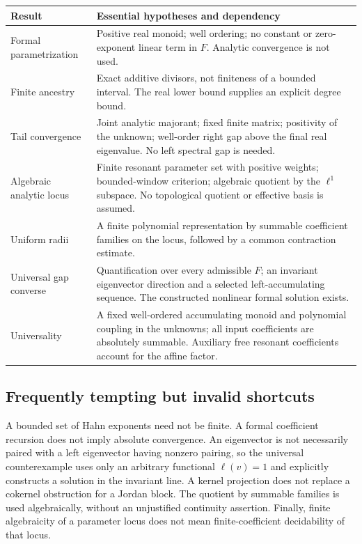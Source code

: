 \documentclass[11pt,a4paper]{article}
\numberwithin{equation}{section}
\theoremstyle{definition}
\theoremstyle{remark}
\begin{document}
\begin{longtable}{@{}p{}p{}@{}}
\toprule
Result & Essential hypotheses and dependency\\
\midrule
\endhead
Formal parametrization & Positive real monoid; well ordering; no constant
or zero-exponent linear term in $F$. Analytic convergence is not used.\\[4pt]
Finite ancestry & Exact additive divisors, not finiteness of a bounded
interval. The real lower bound supplies an explicit degree bound.\\[4pt]
Tail convergence & Joint analytic majorant; fixed finite matrix; positivity
of the unknown; well-order right gap above the final real eigenvalue. No
left spectral gap is needed.\\[4pt]
Algebraic analytic locus & Finite resonant parameter set with positive
weights; bounded-window criterion; algebraic quotient by the $\ell^1$
subspace. No topological quotient or effective basis is assumed.\\[4pt]
Uniform radii & A finite polynomial representation by summable coefficient
families on the locus, followed by a common contraction estimate.\\[4pt]
Universal gap converse & Quantification over every admissible $F$; an
invariant eigenvector direction and a selected left-accumulating sequence.
The constructed nonlinear formal solution exists.\\[4pt]
Universality & A fixed well-ordered accumulating monoid and polynomial
coupling in the unknowns; all input coefficients are absolutely summable.
Auxiliary free resonant coefficients account for the affine factor.\\
\bottomrule
\end{longtable}

\subsection{Frequently tempting but invalid shortcuts}
A bounded set of Hahn exponents need not be finite. A formal coefficient
recursion does not imply absolute convergence. An eigenvector is not
necessarily paired with a left eigenvector having nonzero pairing, so the
universal counterexample uses only an arbitrary functional $\ell(v)=1$
and explicitly constructs a solution in the invariant line. A kernel
projection does not replace a cokernel obstruction for a Jordan block.
The quotient by summable families is used algebraically, without an
unjustified continuity assertion. Finally, finite algebraicity of a
parameter locus does not mean finite-coefficient decidability of that locus.
\end{document}
